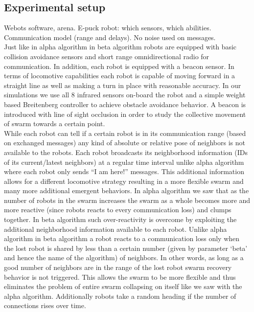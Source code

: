 \documentclass[a4paper, 10pt, conference]{ieeeconf}
\begin{document}
  \subsection{Experimental setup}
  Webots software, arena. E-puck robot: which sensors, which abilities. Communication model (range and delays). No noise used on messages.\\

  Just like in alpha algorithm in beta algorithm robots are equipped with basic collision avoidance sensors and short range omnidirectional radio for communication. In addition, each robot is equipped with a beacon sensor. In terms of locomotive capabilities each robot is capable of moving forward in a straight line as well as making a turn in place with reasonable accuracy. In our simulations we use all 8 infrared sensors on-board the robot and a simple weight based Breitenberg controller to achieve obstacle avoidance behavior. A beacon is introduced with line of sight occlusion in order to study the collective movement of swarm towards a certain point. \\
  While each robot can tell if a certain robot is in its communication range (based on exchanged messages) any kind of absolute or relative pose of neighbors is not available to the robots. Each robot broadcasts its neighborhood information (IDs of its current/latest neighbors) at a regular time interval unlike alpha algorithm where each robot only sends ``I am here!'' messages. This additional information allows for a different locomotive strategy resulting in a more flexible swarm and many more additional emergent behaviors. In alpha algorithm we saw that as the number of robots in the swarm increases the swarm as a whole becomes more and more reactive (since robots reacts to every communication loss) and clumps together. In beta algorithm such over-reactivity is overcome by exploiting the additional neighborhood information available to each robot. Unlike alpha algorithm in beta algorithm a robot reacts to a communication loss only when the lost robot is shared by less than a certain number (given by parameter `beta' and hence the name of the algorithm) of neighbors. In other words, as long as a good number of neighbors are in the range of the lost robot swarm recovery behavior is not triggered. This allows the swarm to be more flexible and thus eliminates the problem of entire swarm collapsing on itself like we saw with the alpha algorithm. Additionally robots take a random heading if the number of connections rises over time.
\end{document}
